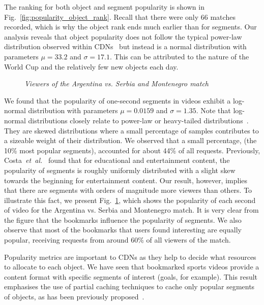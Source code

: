\documentclass[letterpaper,nocopyrightspace]{sig-alternate}
\newcommand{\capttext}{\protect\centering\em}
\begin{document}
The ranking for both object and segment popularity is shown in
Fig.~\ref{fig:popularity_object_rank}. Recall that there were only
66 matches recorded, which is why the object rank ends much earlier
than for segments. Our analysis reveals that object popularity does
not follow the typical power-law distribution observed within
CDNs~\cite{Chesire01Measurement,Almeida01Analysis,yu2006uub} but
instead is a normal distribution with parameters $\mu = 33.2$ and
$\sigma = 17.1$. This can be attributed to the nature of the World Cup
and the relatively few new objects each day.

\begin{figure}[tb]
\centering {} \caption{\capttext Viewers of the Argentina
vs. Serbia and Montenegro match} \label{fig:arg-scg_views}
\end{figure}


We found that the popularity of one-second segments in videos
exhibit a log-normal distribution with parameters $\mu = 0.0159$ and
$\sigma = 1.35$. Note that log-normal distributions closely relate
to power-law or heavy-tailed distributions~\cite{geor06}. They are
skewed distributions where a small percentage of samples contributes
to a sizeable weight of their distribution. We observed that a small
percentage, (the 10\% most popular segments), accounted for about
44\% of all requests. Previously,
Costa~\emph{et~al.}~\cite{Costa04Analyzing} found that for
educational and entertainment content, the popularity of segments is
roughly uniformly distributed with a slight skew towards the
beginning for entertainment content. Our result, however, implies
that there are segments with orders of magnitude more viewers than
others. To illustrate this fact, we present
Fig.~\ref{fig:arg-scg_views}, which shows the popularity of each
second of video for the Argentina vs. Serbia and Montenegro match.
It is very clear from the figure that the bookmarks influence the
popularity of segments. We also observe that most of the bookmarks
that users found interesting are equally popular, receiving requests
from around 60\% of all viewers of the match.

Popularity metrics are important to CDNs as they help to decide what
resources to allocate to each object. We have seen that bookmarked
sports videos provide a content format with specific segments of
interest (goals, for example). This result emphasises the use of
partial caching techniques to cache only popular segments of
objects, as has been previously proposed~\cite{chen2003}.
\end{document}
